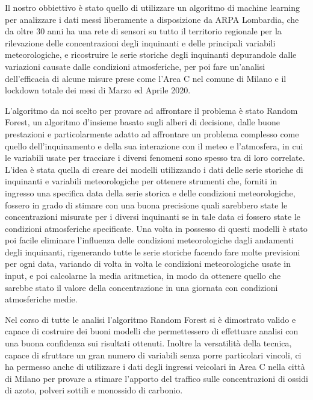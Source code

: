 \documentclass[a4paper]{article}
\begin{document}
Il nostro obbiettivo è stato quello di utilizzare un algoritmo di machine learning per analizzare i dati messi liberamente a disposizione da ARPA Lombardia, che da oltre 30 anni ha una rete di sensori su tutto il territorio regionale per la rilevazione delle concentrazioni degli inquinanti e delle principali variabili meteorologiche, e ricostruire le serie storiche degli inquinanti depurandole dalle variazioni causate dalle condizioni atmosferiche, per poi fare un'analisi dell'efficacia di alcune misure prese come l'Area C nel comune di Milano e il lockdown totale dei mesi di Marzo ed Aprile 2020.

L'algoritmo da noi scelto per provare ad affrontare il problema è stato Random Forest, un algoritmo d'insieme basato sugli alberi di decisione, dalle buone prestazioni e particolarmente adatto ad affrontare un problema complesso come quello dell'inquinamento e della sua interazione con il meteo e l'atmosfera, in cui le variabili usate per tracciare i diversi fenomeni sono spesso tra di loro correlate. L'idea è stata quella di creare dei modelli utilizzando i dati delle serie storiche di inquinanti e variabili meteorologiche per ottenere strumenti che, forniti in ingresso una specifica data della serie storica e delle condizioni meteorologiche, fossero in grado di stimare con una buona precisione quali sarebbero state le concentrazioni misurate per i diversi inquinanti se in tale data ci fossero state le condizioni atmosferiche specificate. Una volta in possesso di questi modelli è stato poi facile eliminare l'influenza delle condizioni meteorologiche dagli andamenti degli inquinanti, rigenerando tutte le serie storiche facendo fare molte previsioni per ogni data, variando di volta in volta le condizioni meteorologiche usate in input, e poi calcolarne la media aritmetica, in modo da ottenere quello che sarebbe stato il valore della concentrazione in una giornata con condizioni atmosferiche medie.

Nel corso di tutte le analisi l'algoritmo Random Forest si è dimostrato valido e capace di costruire dei buoni modelli che permettessero di effettuare analisi con una buona confidenza sui risultati ottenuti. Inoltre la versatilità della tecnica, capace di sfruttare un gran numero di variabili senza porre particolari vincoli, ci ha permesso anche di utilizzare i dati degli ingressi veicolari in Area C nella città di Milano per provare a stimare l'apporto del traffico sulle concentrazioni di ossidi di azoto, polveri sottili e monossido di carbonio.
\end{document}
